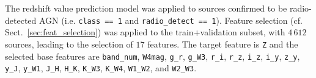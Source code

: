 \documentclass{aa}
\begin{document}
The redshift value prediction model was applied to sources confirmed to be radio-detected AGN (i.e. \texttt{class~==~1} and \texttt{radio\_detect~==~1}).
Feature selection (cf. Sect.~\ref{sec:feat_selection}) was applied to the train+validation subset, with $4\,612$ sources, leading to the selection of $17$ features. The target feature is \verb|Z| and the selected base features are \verb|band_num|, \verb|W4mag|, \verb|g_r|, \verb|g_W3|, \verb|r_i|, \verb|r_z|, \verb|i_z|, \verb|i_y|, \verb|z_y|, \verb|y_J|, \verb|y_W1|, \verb|J_H|, \verb|H_K|, \verb|K_W3|, \verb|K_W4|, \verb|W1_W2|, and \verb|W2_W3|.
\\
\begin{table}
\setlength{\tabcolsep}{3pt}
\caption{Results of initial fit for redshift value prediction}             %
\label{table:fit_redshift_models}      %
\centering                          %
\end{table}
\end{document}
